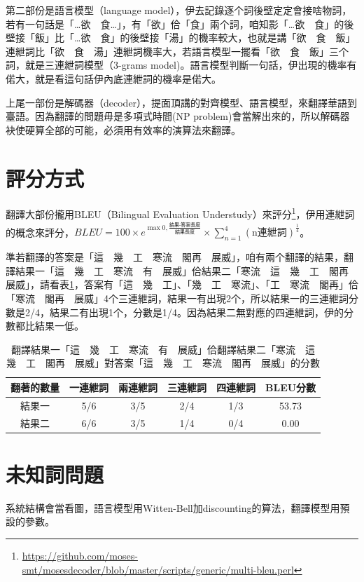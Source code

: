 \documentclass[final,oneside,onecolumn,12pt,a4paper]{book}%
\begin{document}
第二部份是語言模型（language model），伊去記錄逐个詞後壁定定會接啥物詞，若有一句話是「…欲　食…」，有「欲」佮「食」兩个詞，咱知影「…欲　食」的後壁接「飯」比「…欲　食」的後壁接「湯」的機率較大，也就是講「欲　食　飯」連紲詞比「欲　食　湯」連紲詞機率大，若語言模型一擺看「欲　食　飯」三个詞，就是三連紲詞模型（3-grams model)。語言模型判斷一句話，伊出現的機率有偌大，就是看這句話伊內底連紲詞的機率是偌大。

上尾一部份是解碼器（decoder），提面頂講的對齊模型、語言模型，來翻譯華語到臺語。因為翻譯的問題毋是多項式時間(NP problem)會當解出來的，所以解碼器袂使硬算全部的可能，必須用有效率的演算法來翻譯。

\section{評分方式}
\label{節：評分方式}

翻譯大部份攏用BLEU（Bilingual Evaluation Understudy）來評分\footnote{\url{https://github.com/moses-smt/mosesdecoder/blob/master/scripts/generic/multi-bleu.perl}}，伊用連紲詞的概念來評分，$BLEU=100\times{e^{\max{0,\frac{\textit{結果-答案長度}}{\textit{結果長度}}}}}\times{\sum_{n=1}^{4}(\textrm{n連紲詞})^{\frac{1}{4}}}$。

準若翻譯的答案是「這　幾　工　寒流　閣再　展威」，咱有兩个翻譯的結果，翻譯結果一「這　幾　工　寒流　有　展威」佮結果二「寒流　這　幾　工　閣再　展威」，請看表\ref{表：範例BLEU分數}，答案有「這　幾　工」、「幾　工　寒流」、「工　寒流　閣再」佮「寒流　閣再　展威」4个三連紲詞，結果一有出現2个，所以結果一的三連紲詞分數是2/4，結果二有出現1个，分數是1/4。因為結果二無對應的四連紲詞，伊的分數都比結果一低。

\begin{table}
\caption{翻譯結果一「這　幾　工　寒流　有　展威」佮翻譯結果二「寒流　這　幾　工　閣再　展威」對答案「這　幾　工　寒流　閣再　展威」的分數}%
\label{表：範例BLEU分數}
\centering
\begin{tabular}{|c|cccc|c|}
\hline
翻著的數量 & 一連紲詞 & 兩連紲詞 & 三連紲詞 & 四連紲詞 & BLEU分數\\
\hline
結果一 & 5/6 & 3/5 & 2/4 & 1/3 & 53.73\\
\hline
結果二 & 6/6 & 3/5 & 1/4 & 0/4 & 0.00\\
\hline
\end{tabular}
\end{table}


\section{未知詞問題}
\label{節：未知詞問題}
系統結構會當看圖，語言模型用Witten-Bell加discounting的算法，翻譯模型用預設的參數。
\end{document}
